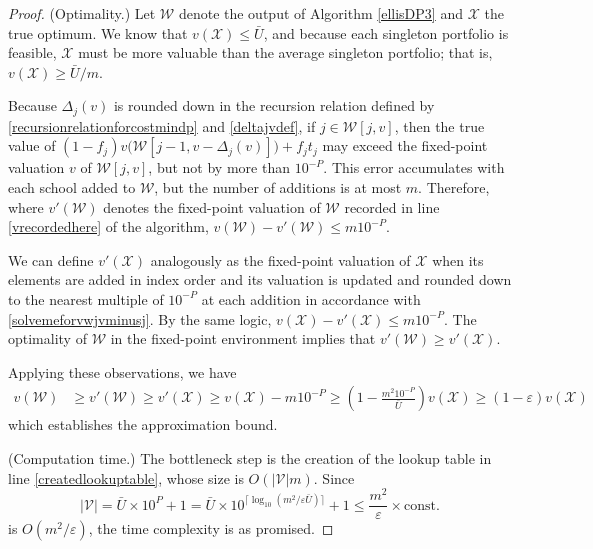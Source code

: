 \documentclass[12pt]{article} %
\theoremstyle{definition}
\theoremstyle{definition}
\begin{document}
\begin{proof}
(Optimality.) Let $\mathcal{W}$ denote the output of Algorithm \ref{ellisDP3} and $\mathcal{X}$ the true optimum. We know that $v(\mathcal{X}) \leq \bar U$, and because each singleton portfolio is feasible, $\mathcal{X}$ must be more valuable than the average singleton portfolio; that is, $v(\mathcal{X}) \geq \bar U / m$. 

Because $\Delta_j(v)$ is rounded down in the recursion relation defined by \eqref{recursionrelationforcostmindp} and \eqref{deltajvdef}, if $j \in \mathcal{W}[j, v]$, then the true value of $(1 - f_j) v\bigl(\mathcal{W}[j-1, v- \Delta_j(v)]\bigr) + f_j t_j$ may exceed the fixed-point valuation $v$ of $\mathcal{W}[j, v]$, but not by more than $10^{-P}$. This error accumulates with each school added to $\mathcal{W}$, but the number of additions is at most $m$. Therefore, where $v'(\mathcal{W})$ denotes the fixed-point valuation of $\mathcal{W}$ recorded in line \ref{vrecordedhere} of the algorithm, 
$v(\mathcal{W}) - v'(\mathcal{W}) \leq m 10^{-P}$.

We can define $v'(\mathcal{X})$ analogously as the fixed-point valuation of $\mathcal{X}$ when its elements are added in index order and its valuation is updated and rounded down to the nearest multiple of $10^{-P}$ at each addition in accordance with \eqref{solvemeforvwjvminusj}. By the same logic, 
$v(\mathcal{X}) - v'(\mathcal{X}) \leq m 10^{-P}$. The optimality of $\mathcal{W}$ in the fixed-point environment implies that $v'(\mathcal{W}) \geq v'(\mathcal{X})$. 

Applying these observations, we have
\begin{equation}
\begin{split}
v(\mathcal{W}) &\geq v'(\mathcal{W}) \geq v'(\mathcal{X})
\geq v(\mathcal{X}) - m 10^{-P}
\geq \left(1 - \frac{m^2 10^{-P}}{\bar U}\right) v(\mathcal{X})
\geq \left(1 - \varepsilon\right) v(\mathcal{X})
\end{split}
\end{equation}
which establishes the approximation bound. 

(Computation time.) The bottleneck step is the creation of the lookup table in line \ref{createdlookuptable}, whose size is $O(|\mathcal{V}| m)$. Since
\begin{equation}
|\mathcal{V}| = \bar U \times 10^{P} + 1 = \bar U \times 10^ { \bigl\lceil\log_{10}\left(m ^2/ \varepsilon \bar U\right)\bigr\rceil} + 1
\leq\frac{m^2}{\varepsilon} \times \text{const.}
\end{equation}
is $O(m^2/ \varepsilon)$, the time complexity is as promised. %
\end{proof}
\end{document}
